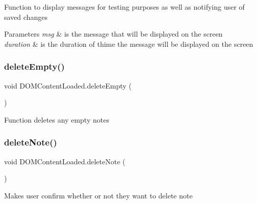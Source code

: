 Function to display messages for testing purposes as well as notifying user of saved changes 
\begin{DoxyParams}{Parameters}
{\em msg} & is the message that will be displayed on the screen \\
\hline
{\em duration} & is the duration of thime the message will be displayed on the screen \\
\hline
\end{DoxyParams}
\mbox{\label{class_d_o_m_content_loaded_a0b00bc687c3f7bee87eccb2aa0e99098}} 
\subsubsection{\texorpdfstring{delete\+Empty()}{deleteEmpty()}}
{\footnotesize\ttfamily void D\+O\+M\+Content\+Loaded.\+delete\+Empty (\begin{DoxyParamCaption}{ }\end{DoxyParamCaption})\hspace{0.3cm}{\ttfamily [inline]}}

Function deletes any empty notes \mbox{\label{class_d_o_m_content_loaded_a08ab37a8c435636cf376a8748dce6f25}} 
\subsubsection{\texorpdfstring{delete\+Note()}{deleteNote()}}
{\footnotesize\ttfamily void D\+O\+M\+Content\+Loaded.\+delete\+Note (\begin{DoxyParamCaption}{ }\end{DoxyParamCaption})\hspace{0.3cm}{\ttfamily [inline]}}

Makes user confirm whether or not they want to delete note \mbox{\label{class_d_o_m_content_loaded_a9797857671c83a1d837a7e7f2e81254c}} 
